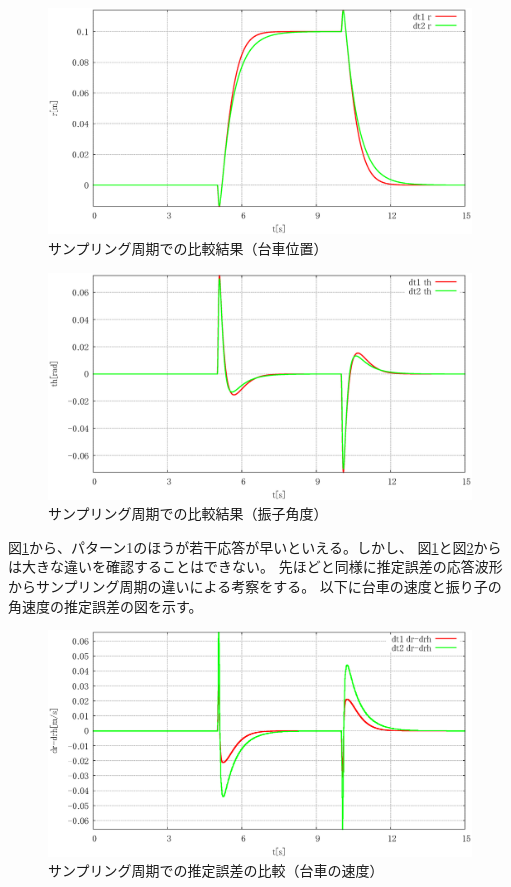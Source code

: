 	\begin{figure}[H]
		\centering
		\includegraphics[width=0.8\linewidth]{gazo/simulation_dt_compare_R.eps}
		\caption{サンプリング周期での比較結果（台車位置）}
		\label{image:simulation_dt_r}
	\end{figure}
	\begin{figure}[H]
		\centering
		\includegraphics[width=0.8\linewidth]{gazo/simulation_dt_compare_THETA.eps}
		\caption{サンプリング周期での比較結果（振子角度）}
		\label{image:simulation_dt_theta}
	\end{figure}
	図\ref{image:simulation_dt_r}から、パターン1のほうが若干応答が早いといえる。しかし、
	図\ref{image:simulation_dt_r}と図\ref{image:simulation_dt_theta}からは大きな違いを確認することはできない。
	先ほどと同様に推定誤差の応答波形からサンプリング周期の違いによる考察をする。
	以下に台車の速度と振り子の角速度の推定誤差の図を示す。
	\begin{figure}[H]
		\centering
		\includegraphics[width=0.8\linewidth]{gazo/simulation_dt_compare_RminusRH.eps}
		\caption{サンプリング周期での推定誤差の比較（台車の速度）}
		\label{image:simulation_dt_rminusrh}
	\end{figure}
